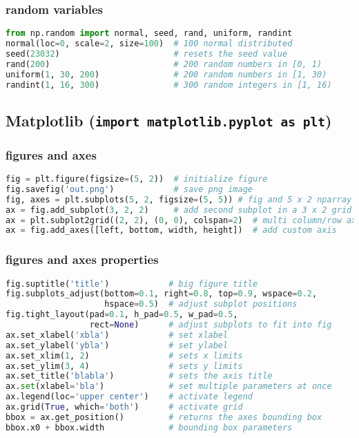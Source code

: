 \documentclass[]{article}
\begin{document}
\subsubsection{random variables}\label{random-variables}

\begin{lstlisting}[language=Python]
from np.random import normal, seed, rand, uniform, randint
normal(loc=0, scale=2, size=100)  # 100 normal distributed
seed(23032)                       # resets the seed value
rand(200)                         # 200 random numbers in [0, 1)
uniform(1, 30, 200)               # 200 random numbers in [1, 30)
randint(1, 16, 300)               # 300 random integers in [1, 16)
\end{lstlisting}

\subsection{\texorpdfstring{Matplotlib
(\texttt{import\ matplotlib.pyplot\ as\ plt})}{Matplotlib (import matplotlib.pyplot as plt)}}\label{matplotlib-import-matplotlib.pyplot-as-plt}

\subsubsection{figures and axes}\label{figures-and-axes}

\begin{lstlisting}[language=Python]
fig = plt.figure(figsize=(5, 2))  # initialize figure
fig.savefig('out.png')            # save png image
fig, axes = plt.subplots(5, 2, figsize=(5, 5)) # fig and 5 x 2 nparray of axes
ax = fig.add_subplot(3, 2, 2)     # add second subplot in a 3 x 2 grid
ax = plt.subplot2grid((2, 2), (0, 0), colspan=2)  # multi column/row axis
ax = fig.add_axes([left, bottom, width, height])  # add custom axis
\end{lstlisting}

\subsubsection{figures and axes
properties}\label{figures-and-axes-properties}

\begin{lstlisting}[language=Python]
fig.suptitle('title')            # big figure title
fig.subplots_adjust(bottom=0.1, right=0.8, top=0.9, wspace=0.2,
                    hspace=0.5)  # adjust subplot positions
fig.tight_layout(pad=0.1, h_pad=0.5, w_pad=0.5,
                 rect=None)      # adjust subplots to fit into fig
ax.set_xlabel('xbla')            # set xlabel
ax.set_ylabel('ybla')            # set ylabel
ax.set_xlim(1, 2)                # sets x limits
ax.set_ylim(3, 4)                # sets y limits
ax.set_title('blabla')           # sets the axis title
ax.set(xlabel='bla')             # set multiple parameters at once
ax.legend(loc='upper center')    # activate legend
ax.grid(True, which='both')      # activate grid
bbox = ax.get_position()         # returns the axes bounding box
bbox.x0 + bbox.width             # bounding box parameters
\end{lstlisting}
\end{document}
